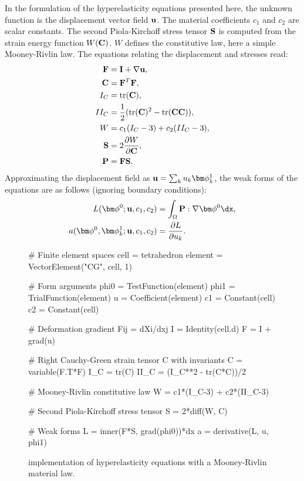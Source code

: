 In the formulation of the hyperelasticity equations presented here,
the unknown function is the displacement vector field $\mathbf{u}$.  The
material coefficients $c_1$ and $c_2$ are scalar constants.  The
second Piola-Kirchoff stress tensor $\mathbf{S}$ is computed from the strain
energy function $W(\mathbf{C})$. $W$ defines the constitutive law, here a
simple Mooney-Rivlin law. The equations relating the displacement and
stresses read:
\begin{align}
\begin{split}
\mathbf{F}   &=  \mathbf{I} + \nabla \mathbf{u}, \\
\mathbf{C}   &=  \mathbf{F}^T\mathbf{F}, \\
I_C   &=  \operatorname{tr}(\mathbf{C}), \\
II_C  &=  \frac 1 2 (\operatorname{tr}(\mathbf{C})^2 - \operatorname{tr}(\mathbf{C}\mathbf{C})), \\
W     &=  c_1(I_C - 3) + c_2(II_C - 3), \\
\mathbf{S}   &=  2\frac{\partial W}{\partial\mathbf{C}}, \\
\mathbf{P}   &=  \mathbf{F}\mathbf{S}.
\end{split}
\end{align}
Approximating the displacement field as $\uu = \sum_k u_k \bphi^1_k$,
the weak forms of the equations are as follows (ignoring boundary conditions):
\begin{align}
L(\bphi^0; \uu, c_1, c_2) &= \int_\Omega \PP : \nabla\bphi^0 \dx, \\
a(\bphi^0, \bphi^1_k; \uu, c_1, c_2) &= \frac{\partial L}{\partial u_k}.
\end{align}
\begin{figure}\label{ufl:fig:hypcode}
\begin{python}
# Finite element spaces
cell = tetrahedron
element = VectorElement("CG", cell, 1)

# Form arguments
phi0 = TestFunction(element)
phi1 = TrialFunction(element)
u = Coefficient(element)
c1 = Constant(cell)
c2 = Constant(cell)

# Deformation gradient Fij = dXi/dxj
I = Identity(cell.d)
F = I + grad(u)

# Right Cauchy-Green strain tensor C with invariants
C = variable(F.T*F)
I_C = tr(C)
II_C = (I_C**2 - tr(C*C))/2

# Mooney-Rivlin constitutive law
W = c1*(I_C-3) + c2*(II_C-3)

# Second Piola-Kirchoff stress tensor
S = 2*diff(W, C)

# Weak forms
L = inner(F*S, grad(phi0))*dx
a = derivative(L, u, phi1)
\end{python}
\caption{\ufl{} implementation of hyperelasticity equations with a Mooney-Rivlin material law.}
\end{figure}
